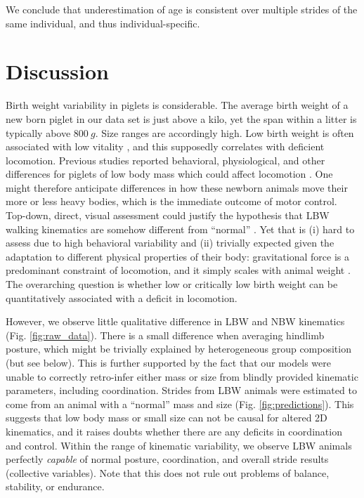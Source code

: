 We conclude that underestimation of age is consistent over multiple strides of the same individual, and thus individual-specific.

\FloatBarrier
\clearpage
\section{Discussion}
\label{discussion_22}

Birth weight variability in piglets is considerable.
The average birth weight of a new born piglet in our data set is just above a kilo, yet the span within a litter is typically above \(800\ g\).
Size ranges are accordingly high.
Low birth weight is often associated with low vitality \citep{Baxter2008,Hales2013,Muns2013}, and this supposedly correlates with deficient locomotion.
Previous studies reported behavioral, physiological, and other differences for piglets of low body mass which could affect locomotion \citep{Quiniou2002,Muns2013,VandenHole2018b,Alvarenga2013,VandenHole2018,Roelofs2019}.
One might therefore anticipate differences in how these newborn animals move their more or less heavy bodies, which is the immediate outcome of motor control.
Top-down, direct, visual assessment could justify the hypothesis that LBW walking kinematics are somehow different from ``normal'' \citep{DEath2012}.
Yet that is (i) hard to assess due to high behavioral variability and (ii) trivially expected given the adaptation to different physical properties of their body: gravitational force is a predominant constraint of locomotion, and it simply scales with animal weight \citep{Aerts2023}.
The overarching question is whether low or critically low birth weight can be quantitatively associated with a deficit in locomotion.


However, we observe little qualitative difference in LBW and NBW kinematics (Fig. \ref{fig:raw_data}).
There is a small difference when averaging hindlimb posture, which might be trivially explained by heterogeneous group composition (but see below).
This is further supported by the fact that our models were unable to correctly retro-infer either mass or size from blindly provided kinematic parameters, including coordination.
Strides from LBW animals were estimated to come from an animal with a ``normal'' mass and size (Fig. \ref{fig:predictions}).
This suggests that low body mass or small size can not be causal for altered 2D kinematics, and it raises doubts whether there are any deficits in coordination and control.
Within the range of kinematic variability, we observe LBW animals perfectly \emph{capable} of normal posture, coordination, and overall stride results (collective variables).
Note that this does not rule out problems of balance, stability, or endurance.


